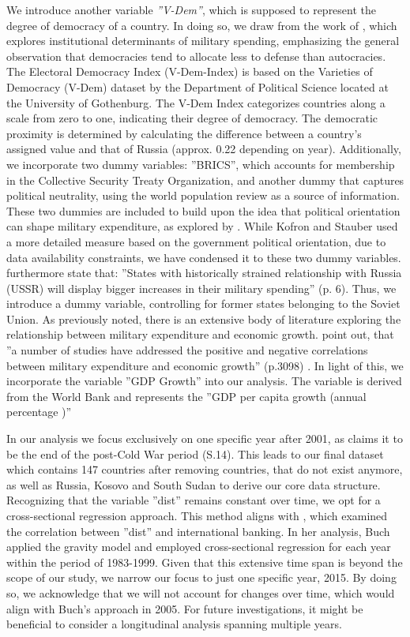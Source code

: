 \documentclass[12pt,a4paper]{article}
\begin{document}
We introduce another variable \textit{''V-Dem''}, which is supposed to represent the degree of democracy of a country. In doing so, we draw from the work of \citet{albalate2012}, which explores institutional determinants of military spending, emphasizing the general observation that democracies tend to allocate less to defense than autocracies. The Electoral Democracy Index (V-Dem-Index) is based on the Varieties of Democracy (V-Dem) dataset \citep{VDEM} by the Department of Political Science located at the University of Gothenburg. The V-Dem Index categorizes countries along a scale from zero to one, indicating their degree of democracy. The democratic proximity is determined by calculating the difference between a country’s assigned value and that of Russia (approx. 0.22 depending on year). Additionally, we incorporate two dummy variables: ''BRICS'', which accounts for membership in the Collective Security Treaty Organization, and another dummy that captures political neutrality, using the world population review as a source of information. These two dummies are included to build upon the idea that political orientation can shape military expenditure, as explored by \citet{kofrovn2023}. While Kofron and Stauber used a more detailed measure based on the government political orientation, due to data availability constraints, we have condensed it to these two dummy variables. \citet{kofrovn2023} furthermore state that: ''States with historically strained relationship with Russia (USSR) will display bigger increases in their military spending'' (p. 6). Thus, we introduce a dummy variable, controlling for former states belonging to the Soviet Union. As previously noted, there is an extensive body of literature exploring the relationship between military expenditure and economic growth. \citet{lin2019} point out, that ''a number of studies have addressed the positive and negative correlations between military expenditure and economic growth'' (p.3098) . In light of this, we incorporate the variable ''GDP Growth'' into our analysis. The variable is derived from the World Bank and represents the ''GDP per capita growth (annual percentage )''

In our analysis we focus exclusively on one specific year after 2001, as \citet{gray2005} claims it to be the end of the post-Cold War period (S.14). This leads to our final dataset which contains 147 countries after removing countries, that do not exist anymore, as well as Russia, Kosovo and South Sudan to derive our core data structure. Recognizing that the variable ''dist'' remains constant over time, we opt for a cross-sectional regression approach. This method aligns with \citet{buch2005}, which examined the correlation between ''dist'' and international banking. In her analysis, Buch applied the gravity model and employed cross-sectional regression for each year within the period of 1983-1999. Given that this extensive time span is beyond the scope of our study, we narrow our focus to just one specific year, 2015. By doing so, we acknowledge that we will not account for changes over time, which would align with Buch's approach in 2005. For future investigations, it might be beneficial to consider a longitudinal analysis spanning multiple years. 
\end{document}
